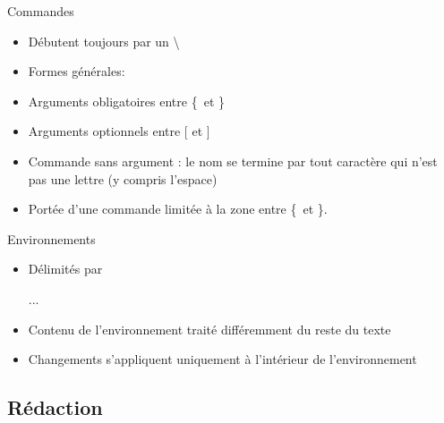 \begin{frame}[fragile]{Commandes}
	\begin{itemize}
		\item Débutent toujours par un \textbackslash
		\item Formes générales:
\begin{codesource}
	\nomcommande
\end{codesource}
		\item Arguments obligatoires entre \{\ et \}
		\item Arguments optionnels entre [ et ]
		\item Commande sans argument : le nom se termine par tout caractère qui n’est pas une lettre (y
		compris l’espace)
		\item Portée d’une commande limitée à la zone entre \{\ et \}.
	\end{itemize}
\end{frame}

\begin{frame}[fragile,c]{Environnements}
	\begin{itemize}
		\item Délimités par
\begin{codesource}
	\begin{environnement}
		...
	\end{environnement}
\end{codesource}
		\item Contenu de l’environnement traité différemment du reste du texte
		\item Changements s’appliquent uniquement à l’intérieur de l’environnement
	\end{itemize}
\end{frame}

\subsection{Rédaction}

